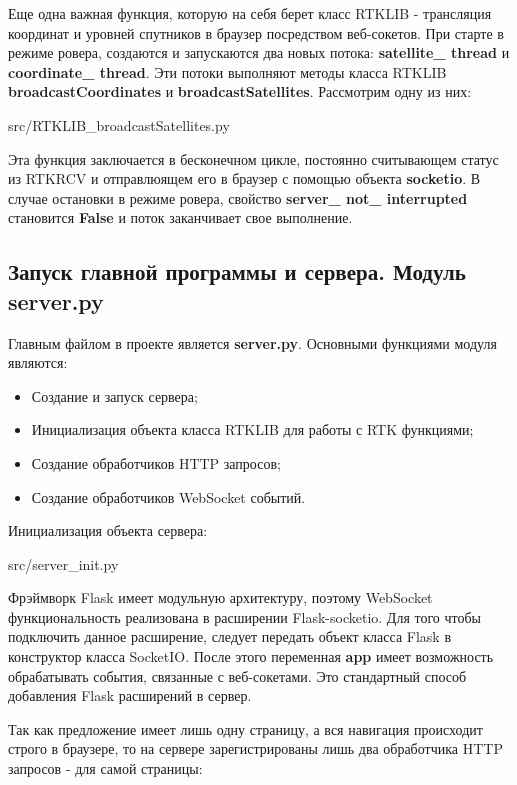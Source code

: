 Еще одна важная функция, которую на себя берет класс RTKLIB - трансляция координат и уровней спутников в браузер посредством веб-сокетов. При старте в режиме ровера, создаются и запускаются два новых потока: \textbf{satellite\_ thread} и \textbf{coordinate\_ thread}. Эти потоки выполняют методы класса RTKLIB \textbf{broadcastCoordinates} и \textbf{broadcastSatellites}. Рассмотрим одну из них:


{src/RTKLIB_broadcastSatellites.py}

Эта функция заключается в бесконечном цикле, постоянно считывающем статус из RTKRCV и отправлюящем его в браузер с помощью объекта \textbf{socketio}. В случае остановки в режиме ровера, свойство \textbf{server\_ not\_ interrupted} становится \textbf{False} и поток заканчивает свое выполнение.

\subsection{Запуск главной программы и сервера. Модуль server.py} \label{subsect3_1_5}

Главным файлом в проекте является \textbf{server.py}. Основными функциями модуля являются:

\begin{itemize}
  \item Создание и запуск сервера;
  \item Инициализация объекта класса RTKLIB для работы с RTK функциями;
  \item Создание обработчиков HTTP запросов;
  \item Создание обработчиков WebSocket событий.
\end{itemize}

Инициализация объекта сервера:


{src/server_init.py}

Фрэймворк Flask имеет модульную архитектуру, поэтому WebSocket функциональность реализована в расширении Flask-socketio. Для того чтобы подключить данное расширение, следует передать объект класса Flask в конструктор класса SocketIO. После этого переменная \textbf{app} имеет возможность обрабатывать события, связанные с веб-сокетами. Это стандартный способ добавления Flask расширений в сервер.

Так как предложение имеет лишь одну страницу, а вся навигация происходит строго в браузере, то на сервере зарегистрированы лишь два обработчика HTTP запросов - для самой страницы:

